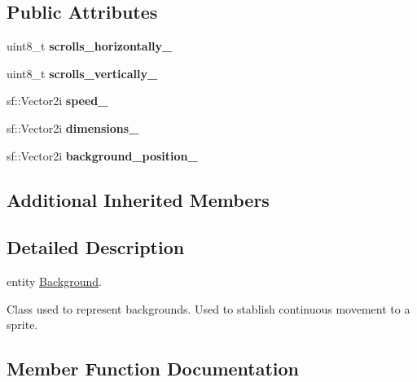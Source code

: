 \subsection*{Public Attributes}
\begin{DoxyCompactItemize}
\item 
\mbox{\label{class_background_a9150d8924dc8e74ff9852d33cc0b574f}} 
uint8\+\_\+t {\bfseries scrolls\+\_\+horizontally\+\_\+}
\item 
\mbox{\label{class_background_aa26c61f1bbed1d8a8625b51bc3cc16dd}} 
uint8\+\_\+t {\bfseries scrolls\+\_\+vertically\+\_\+}
\item 
\mbox{\label{class_background_a4402837678f3b72ac1f5803c97dfba28}} 
sf\+::\+Vector2i {\bfseries speed\+\_\+}
\item 
\mbox{\label{class_background_a515f93f6c513ec0519c02fa30c8bc5fa}} 
sf\+::\+Vector2i {\bfseries dimensions\+\_\+}
\item 
\mbox{\label{class_background_abf90fe1fcc93375f86aee37a1dddbe37}} 
sf\+::\+Vector2i {\bfseries background\+\_\+position\+\_\+}
\end{DoxyCompactItemize}
\subsection*{Additional Inherited Members}


\subsection{Detailed Description}
entity \hyperlink{class_background}{Background}.

Class used to represent backgrounds. Used to stablish continuous movement to a sprite. 

\subsection{Member Function Documentation}
\mbox{\label{class_background_aafc5996195781b2d4bff7d170792425d}} 
